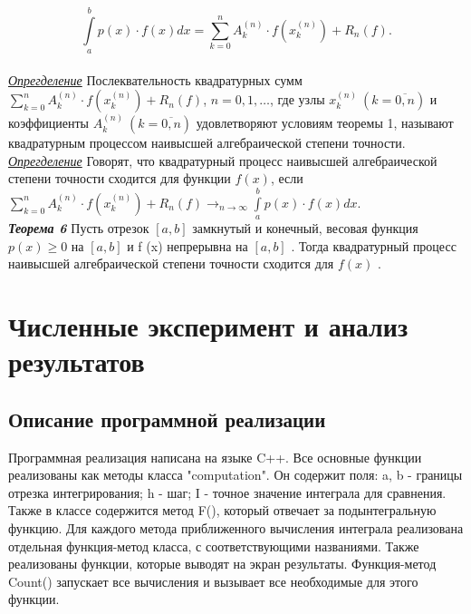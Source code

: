 \documentclass[14pt,a4paper,titlepage]{extarticle}
\begin{document}
\begin{equation}
		\int\limits_a^b p(x)\cdot f(x)dx = \sum_{k = 0}^n A_k^{(n)} \cdot f(x_k^{(n)}) + R_n(f).
		\label{(7)}
	\end{equation}
	\\
\textit{\underline{Опрегделение}}
	Послеквательность квадратурных сумм $\sum_{k = 0}^n A_k^{(n)} \cdot f(x_k^{(n)}) + R_n(f)$, $n = 0, 1, \ldots$, где узлы  $x_k^{(n)} \ (k = \overline{0,n})$ и коэффициенты $A_k^{(n)}  \ (k = \overline{0,n})$ удовлетворяют условиям теоремы 1, называют квадратурным процессом наивысшей алгебраической степени точности.
		\\
\textit{\underline{Опрегделение}}
Говорят, что квадратурный процесс наивысшей алгебраической степени точности сходится для функции $f (x)$, если \\ $\sum_{k = 0}^n A_k^{(n)} \cdot f(x_k^{(n)}) + R_n(f) \rightarrow_{n\rightarrow\infty} \int\limits_a^b p(x)\cdot f(x)dx$.
\\
\textit{{\textbf{Теорема 6}}}
Пусть отрезок $\left[  a, b\right] $ замкнутый и конечный, весовая
функция $p(x) \geqslant 0$ на $\left[  a, b\right] $ и f (x) непрерывна на $\left[  a, b\right] $ . Тогда квадратурный процесс наивысшей алгебраической степени точности сходится для $f (x)$ .	

{\centering\section{Численные эксперимент и анализ результатов}}
{\centering\subsection{Описание программной реализации}}
Программная реализация написана на языке C++. Все основные функции реализованы как методы класса "computation".
Он содержит поля: a, b - границы отрезка интегрирования; h - шаг; I - точное значение интеграла для сравнения. Также в классе содержится метод F(), который отвечает за подынтегральную функцию. Для каждого метода приближенного вычисления интеграла реализована отдельная функция-метод класса, с соответствующими названиями. Также реализованы функции, которые выводят на экран результаты. Функция-метод Count() запускает все вычисления и вызывает все необходимые для этого функции.
\end{document}
